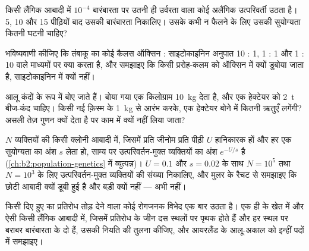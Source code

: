 \begin{exercise}[$\star\star$]\label{exo:b2:asexual-reproduction:7}
किसी लैंगिक आबादी में $10^{-4}$ बारंबारता पर उतनी ही उर्वरता वाला कोई
अलैंगिक उत्परिवर्ती उठता है। 5,
10 और 15 पीढ़ियों बाद उसकी बारंबारता निकालिए। उसके कभी न फैलने के लिए
उसकी सुयोग्यता कितनी घटनी चाहिए?
\end{exercise}

\begin{exercise}[$\star\star$]\label{exo:b2:asexual-reproduction:8}
भविष्यवाणी कीजिए कि तंबाकू का कोई कैलस ऑक्सिन : साइटोकाइनिन
अनुपात 10 : 1, 1 : 1 और 1 : 10 वाले माध्यमों पर क्या करता है, और
समझाइए कि किसी प्ररोह-कलम को ऑक्सिन में क्यों डुबोया जाता है, साइटोकाइनिन में क्यों नहीं।
\end{exercise}

\begin{exercise}[$\star\star$]\label{exo:b2:asexual-reproduction:9}
आलू कंदों के रूप में बोए जाते हैं। बोया गया एक किलोग्राम
\qty{10}{kg} देता है, और एक हेक्टेयर को \qty{2}{t} बीज-कंद चाहिए। किसी
नई क़िस्म के \qty{1}{kg} से आरंभ करके, एक हेक्टेयर बोने में कितनी ऋतुएँ
लगेंगी? असली  तेज़ गुणन क्यों देता है पर काम में क्यों नहीं लिया
जाता?
\end{exercise}

\begin{exercise}[$\star\star\star$]\label{exo:b2:asexual-reproduction:10}
$N$ व्यक्तियों की किसी क्लोनी आबादी में, जिसमें प्रति जीनोम प्रति पीढ़ी
$U$ हानिकारक  हों और हर एक सुयोग्यता का अंश $s$ लेता हो,
साम्य पर उत्परिवर्तन-मुक्त व्यक्तियों का अंश
$e^{-U/s}$ है (\cref{ch:b2:population-genetics} में व्युत्पन्न)। $U =
0.1$ और $s = 0.02$ के साथ $N = 10^{5}$ तथा $N = 10^{3}$ के लिए
उत्परिवर्तन-मुक्त व्यक्तियों की संख्या निकालिए, और
मुलर के रैचट से समझाइए कि छोटी आबादी क्यों डूबी हुई है और बड़ी
क्यों नहीं --- अभी नहीं।
\end{exercise}

\begin{exercise}[$\star\star\star$]\label{exo:b2:asexual-reproduction:11}
किसी दिए हुए  का प्रतिरोध तोड़ देने वाला कोई रोगजनक विभेद
एक बार उठता है। एक ही  के खेत में और ऐसी किसी
लैंगिक आबादी में, जिसमें प्रतिरोध के जीन दस स्थलों पर पृथक होते हैं और
हर स्थल पर बराबर बारंबारता के दो  हैं, उसकी नियति की तुलना
कीजिए, और आयरलैंड के आलू-अकाल को इन्हीं पदों में समझाइए।
\end{exercise}

